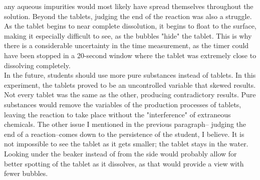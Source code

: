 \documentclass[a4paper]{article}
\begin{document}
        any aqueous impurities would most likely have spread themselves throughout the solution. Beyond
        the tablets, judging the end of the reaction was also a struggle. As the tablet begins to near
        complete dissolution, it begins to float to the surface, making it especially difficult to see,
        as the bubbles "hide" the tablet. This is why there is a considerable uncertainty in the time
        measurement, as the timer could have been stopped in a 20-second window where the tablet was
        extremely close to dissolving completely.
        \\
        In the future, students should use more pure substances instead of tablets. In this experiment,
        the tablets proved to be an uncontrolled variable that skewed results. Not every tablet was
        the same as the other, producing contradictory results. Pure substances would remove the
        variables of the production processes of tablets, leaving the reaction to take place without
        the "interference" of extraneous chemicals. The other issue I mentioned in the previous paragraph--
        judging the end of a reaction--comes down to the persistence of the student, I believe. It is
        not impossible to see the tablet as it gets smaller; the tablet stays in the water. Looking
        under the beaker instead of from the side would probably allow for better spotting of the tablet
        as it dissolves, as that would provide a view with fewer bubbles.
\end{document}
